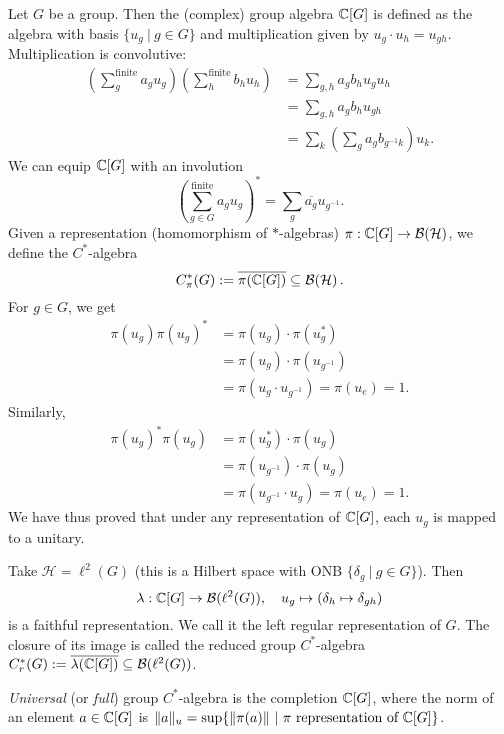 Let $G$ be a group. Then the (complex) group algebra $\mathbb {C} [G]$ is defined as the algebra with basis 
$\{u_g\ |\ g \in G\}$ and multiplication given by $u_g \cdot u_h = u_{gh}$.
Multiplication is convolutive:
\begin{align*}
  \left(\sum_g ^{\mathrm{finite}} a_g u_g\right) \left(\sum_h ^{\mathrm{finite}} b_h u_h \right) &= \sum_{g, h} a_g b_h u_g u_h\\
  &= \sum_{g, h} a_g b_h u_{gh}\\
  &= \sum_k \left(\sum_g a_g b_{g^{-1} k}\right) u_k.
\end{align*}
We can equip $\mathbb {C} [G]$ with an involution 
$$\left(\sum_{g \in G} ^{\mathrm{finite}} a_g u_g\right)^* = \sum_g \overline{a_g} u_{g^{-1}}.$$
Given a representation (homomorphism of $*$-algebras) $\pi: \mathbb {C} [G] \to \operatorname{\mathcal{B} (\mathcal{H})}$,
we define the $C^*$-algebra 
$$C_{\pi} ^* (G) := \overline{\pi(\mathbb {C} [G])} \subseteq \operatorname{\mathcal{B} (\mathcal{H})}.$$
For $g \in G$, we get 
\begin{align*}
  \pi(u_g) \pi(u_g) ^* &= \pi(u_g) \cdot \pi(u_g ^*)\\
  &= \pi(u_g) \cdot \pi(u_{g^{-1}})\\
  &= \pi(u_g \cdot u_{g^{-1}}) = \pi(u_e) = 1.
\end{align*}
Similarly,
\begin{align*}
  \pi(u_g) ^* \pi(u_g) &= \pi(u_g ^*) \cdot \pi(u_g)\\
  &=\pi(u_{g^{-1}}) \cdot \pi(u_g) \\
  &= \pi(u_{g^{-1}} \cdot u_g) = \pi(u_e) = 1.
\end{align*}
We have thus proved that under any representation of $\mathbb {C}[G]$,
each $u_g$ is mapped to a unitary.

\begin{example}
  Take $\mathcal{H} = \ell^2 (G)$ (this is a Hilbert space with ONB $\{\delta_g\ |\ g \in G\}$).
  Then $$\lambda : \mathbb {C} [G] \to \mathcal{B} (\ell^2 (G)),\quad u_g \mapsto (\delta_h \mapsto \delta_{gh})$$
  is a faithful representation. We call it the left regular representation of $G$.
  The closure of its image is called the reduced group $C^*$-algebra $C_r ^* (G) := \overline{\lambda(\mathbb {C}[G])} \subseteq \mathcal{B}(\ell^2 (G))$.
\end{example}

\begin{definition}\label{def:3.1}
  \emph{Universal} (or \emph{full}) group $C^*$-algebra is the completion $\mathbb {C}[G]$, where the norm of an element $a \in \mathbb {C}[G]$
  is $\| a\|_u = \sup \{\| \pi(a)\|\ |\ \textrm{$\pi$ representation of $\C[G]$}\}$.
\end{definition}

